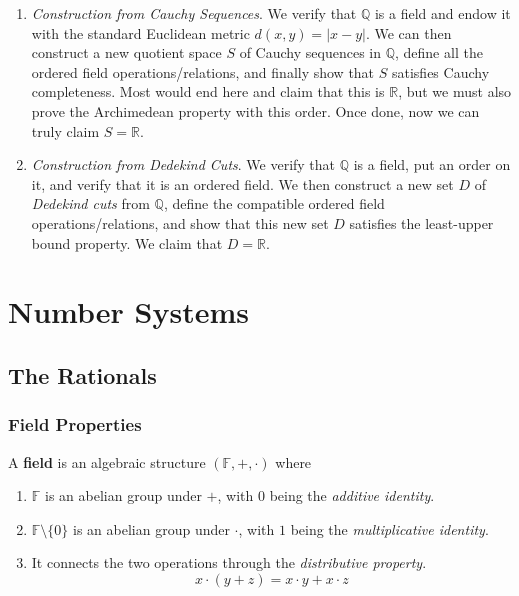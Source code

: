 \documentclass{article}
\begin{document}
  \begin{enumerate}
    \item \textit{Construction from Cauchy Sequences}. We verify that $\mathbb{Q}$ is a field and endow it with the standard Euclidean metric $d(x, y) = |x - y|$. We can then construct a new quotient space $S$ of Cauchy sequences in $\mathbb{Q}$, define all the ordered field operations/relations, and finally show that $S$ satisfies Cauchy completeness. Most would end here and claim that this is $\mathbb{R}$, but we must also prove the Archimedean property with this order. Once done, now we can truly claim $S = \mathbb{R}$. 

    \item \textit{Construction from Dedekind Cuts}. We verify that $\mathbb{Q}$ is a field, put an order on it, and verify that it is an ordered field. We then construct a new set $D$ of \textit{Dedekind cuts} from $\mathbb{Q}$, define the compatible ordered field operations/relations, and show that this new set $D$ satisfies the least-upper bound property. We claim that $D = \mathbb{R}$. 
  \end{enumerate} 

\section{Number Systems} 

  \subsection{The Rationals}

    \subsubsection{Field Properties}  

      \begin{definition}[Field]
        A \textbf{field} is an algebraic structure $(\mathbb{F}, +, \cdot)$ where 
        \begin{enumerate}
          \item $\mathbb{F}$ is an abelian group under $+$, with $0$ being the \textit{additive identity}. 
          \item $\mathbb{F} \setminus \{0\}$ is an abelian group under $\cdot$, with $1$ being the \textit{multiplicative identity}. 
          \item It connects the two operations through the \textit{distributive property}.
          \begin{equation}
            x \cdot (y + z) = x \cdot y + x \cdot z
          \end{equation}
        \end{enumerate}
      \end{definition} 
\end{document}
